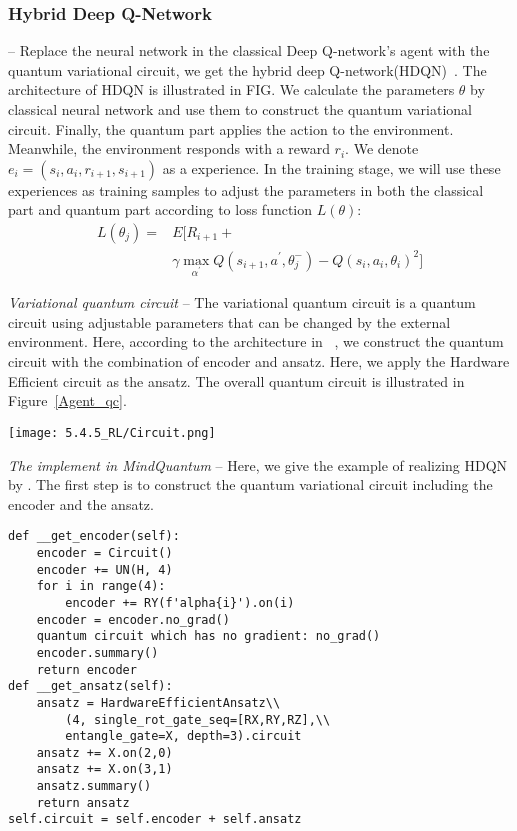 \subsubsection{Hybrid Deep Q-Network} -- Replace the neural network in the classical Deep Q-network's agent with the quantum variational circuit, we get the hybrid deep Q-network(HDQN)~\cite{Q_rl}. The architecture of HDQN is illustrated in FIG. We calculate the parameters $\theta$ by classical neural network and use them to construct the quantum variational circuit. Finally, the quantum part applies the action to the environment. Meanwhile, the environment responds with a reward $r_i$. We denote $e_i=(s_i,a_i,r_{i+1},s_{i+1})$ as a experience. In the training stage, we will use these experiences as training samples to adjust the parameters in both the classical part and quantum part according to loss function $L(\theta)$:
\begin{equation}
\begin{split}
    L(\theta_{j})=&E[R_{i+1}+\\
    &\gamma \max_{\alpha^{'}}Q(s_{i+1},a^{'},\theta_{j}^{-})-Q(s_{i},a_{i},\theta_{i})^2]
\end{split}
\label{loss func}
\end{equation}

\textit{Variational quantum circuit} -- The variational quantum circuit is a quantum circuit using adjustable parameters that can be changed by the external environment. Here, according to the architecture in ~\cite{Q_rl}, we construct the quantum circuit with the combination of encoder and ansatz. Here, we apply the Hardware Efficient circuit as the ansatz. The overall quantum circuit is illustrated in Figure~\ref{Agent_qc}.

\begin{figure*}[ht]
  \centering
  \texttt{[image: 5.4.5\_RL/Circuit.png]}
  \caption{\label{Agent_qc} The overall quantum circuit of agent in RL.}
\end{figure*}

\textit{The implement in MindQuantum} -- Here, we give the example of realizing HDQN by \MindQuantum. The first step is to construct the quantum variational circuit including the encoder and the ansatz.
\begin{lstlisting}
def __get_encoder(self):
    encoder = Circuit()
    encoder += UN(H, 4)
    for i in range(4):
        encoder += RY(f'alpha{i}').on(i)
    encoder = encoder.no_grad()
    quantum circuit which has no gradient: no_grad()
    encoder.summary()
    return encoder
def __get_ansatz(self):
    ansatz = HardwareEfficientAnsatz\\
        (4, single_rot_gate_seq=[RX,RY,RZ],\\
        entangle_gate=X, depth=3).circuit
    ansatz += X.on(2,0)
    ansatz += X.on(3,1)
    ansatz.summary()
    return ansatz
self.circuit = self.encoder + self.ansatz
\end{lstlisting}

